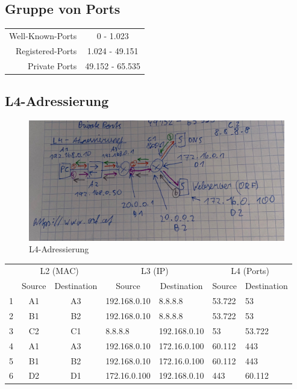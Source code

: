 \subsection*{Gruppe von Ports}
\begin{table}[H]
	\begin{tabular}{rc}
		Well-Known-Ports & 0 - 1.023 \\
		Registered-Ports & 1.024 - 49.151 \\
		Private Ports & 49.152 - 65.535
	\end{tabular}
\end{table}

\subsection*{L4-Adressierung}
\begin{figure}[H]
	\centering
	\includegraphics[width=1.0\linewidth]{figures/l4_addr.jpeg}
	\caption{L4-Adressierung}
\end{figure}

\begin{table}[H]
	\begin{tabular}{c|ccllll}
		& \multicolumn{2}{c}{L2 (MAC)} & \multicolumn{2}{c}{L3 (IP)} & \multicolumn{2}{c}{L4 (Ports)} \\
		& \multicolumn{1}{c}{Source} & \multicolumn{1}{c}{Destination} & \multicolumn{1}{c}{Source} & \multicolumn{1}{c}{Destination} & \multicolumn{1}{c}{Source} & \multicolumn{1}{c}{Destination} \\
		\hline
		1 & A1 & A3 & 192.168.0.10 & 8.8.8.8 & 53.722 & 53 \\
		2 & B1 & B2 & 192.168.0.10 & 8.8.8.8 & 53.722 & 53 \\
		3 & C2 & C1 & 8.8.8.8 & 192.168.0.10 & 53 & 53.722 \\
		4 & A1 & A3 & 192.168.0.10 & 172.16.0.100 & 60.112 & 443 \\
		5 & B1 & B2 & 192.168.0.10 & 172.16.0.100 & 60.112 & 443 \\
		6 & D2 & D1 & 172.16.0.100 & 192.168.0.10 & 443 & 60.112
	\end{tabular}
\end{table}

